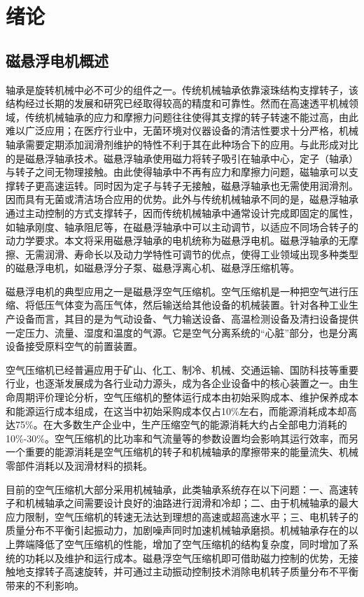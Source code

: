 
\chapter{绪论}
\section{磁悬浮电机概述}
轴承是旋转机械中必不可少的组件之一。传统机械轴承依靠滚珠结构支撑转子，该结构经过长期的发展和研究已经取得较高的精度和可靠性。然而在高速透平机械领域，传统机械轴承的应力和摩擦力问题往往使得其支撑的转子转速不能过高，由此难以广泛应用；在医疗行业中，无菌环境对仪器设备的清洁性要求十分严格，机械轴承需要定期添加润滑剂维护的特性不利于其在此种场合下的应用。与此形成对比的是磁悬浮轴承技术。磁悬浮轴承使用磁力将转子吸引在轴承中心，定子（轴承）与转子之间无物理接触。由此使得轴承中不再有应力和摩擦力问题，磁轴承可以支撑转子更高速运转。同时因为定子与转子无接触，磁悬浮轴承也无需使用润滑剂。因而具有无菌或清洁场合应用的优势。此外与传统机械轴承不同的是，磁悬浮轴承通过主动控制的方式支撑转子，因而传统机械轴承中通常设计完成即固定的属性，如轴承刚度、轴承阻尼等，在磁悬浮轴承中可以主动调节，以适应不同场合转子的动力学要求。本文将采用磁悬浮轴承的电机统称为磁悬浮电机。磁悬浮轴承的无摩擦、无需润滑、寿命长以及动力学特性可调节的优点，使得工业领域出现多种类型的磁悬浮电机，如磁悬浮分子泵、磁悬浮离心机、磁悬浮压缩机等。

磁悬浮电机的典型应用之一是磁悬浮空气压缩机。空气压缩机是一种把空气进行压缩、将低压气体变为高压气体，然后输送给其他设备的机械装置。针对各种工业生产设备而言，其目的是为气动设备、气力输送设备、高温检测设备及清扫设备提供一定压力、流量、湿度和温度的气源。它是空气分离系统的“心脏”部分，也是分离设备接受原料空气的前置装置。

空气压缩机已经普遍应用于矿山、化工、制冷、机械、交通运输、国防科技等重要行业，也逐渐发展成为各行业动力源头，成为各企业设备中的核心装置之一。由生命周期评价理论分析，空气压缩机的整体运行成本由初始采购成本、维护保养成本和能源运行成本组成，在这当中初始采购成本仅占10\%左右，而能源消耗成本却高达75\%。在大多数生产企业中，生产压缩空气的能源消耗大约占全部电力消耗的 10\%-30\%。空气压缩机的比功率和气流量等的参数设置均会影响其运行效率，而另一个重要的能源消耗是空气压缩机的转子和机械轴承的摩擦带来的能量流失、机械零部件消耗以及润滑材料的损耗。

目前的空气压缩机大部分采用机械轴承，此类轴承系统存在以下问题：一、高速转子和机械轴承之间需要设计良好的油路进行润滑和冷却；二、由于机械轴承的最大应力限制，空气压缩机的转速无法达到理想的高速或超高速水平；三、电机转子的质量分布不平衡引起振动力，加剧噪声同时加速机械轴承磨损。机械轴承存在的以上弊端降低了空气压缩机的性能，增加了空气压缩机的结构复杂度，同时增加了系统的功耗以及维护和运行成本。磁悬浮空气压缩机即可借助磁力控制的优势，无接触地支撑转子高速旋转，并可通过主动振动控制技术消除电机转子质量分布不平衡带来的不利影响。

